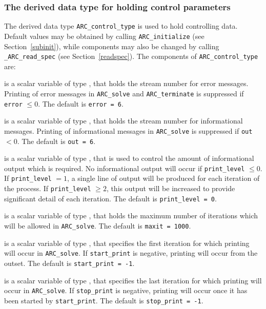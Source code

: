 \documentclass{galahad}
\newcommand{\packagename}{ARC}
\newcommand{\fullpackagename}{\libraryname\_\packagename}
\begin{document}

\subsubsection{The derived data type for holding control
 parameters}\label{typecontrol}
The derived data type
{\tt \packagename\_control\_type}
is used to hold controlling data. Default values may be obtained by calling
{\tt \packagename\_initialize}
(see Section~\ref{subinit}),
while components may also be changed by calling
{\tt \fullpackagename\_read\-\_spec}
(see Section~\ref{readspec}).
The components of
{\tt \packagename\_control\_type}
are:


\begin{description}

 is a scalar variable of type \integer, that holds the
stream number for error messages. Printing of error messages in
{\tt \packagename\_solve} and {\tt \packagename\_terminate}
is suppressed if {\tt error} $\leq 0$.
The default is {\tt error = 6}.

 is a scalar variable of type \integer, that holds the
stream number for informational messages. Printing of informational messages in
{\tt \packagename\_solve} is suppressed if {\tt out} $< 0$.
The default is {\tt out = 6}.

 is a scalar variable of type \integer, that is used
to control the amount of informational output which is required. No
informational output will occur if {\tt print\_level} $\leq 0$. If
{\tt print\_level} $= 1$, a single line of output will be produced for each
iteration of the process. If {\tt print\_level} $\geq 2$, this output will be
increased to provide significant detail of each iteration.
The default is {\tt print\_level = 0}.

 is a scalar variable of type \integer, that holds the
maximum number of iterations which will be allowed in {\tt \packagename\_solve}.
The default is {\tt maxit = 1000}.

 is a scalar variable of type \integer, that specifies
the first iteration for which printing will occur in {\tt \packagename\_solve}.
If {\tt start\_print} is negative, printing will occur from the outset.
The default is {\tt start\_print = -1}.

 is a scalar variable of type \integer, that specifies
the last iteration for which printing will occur in  {\tt \packagename\_solve}.
If {\tt stop\_print} is negative, printing will occur once it has been
started by {\tt start\_print}.
The default is {\tt stop\_print = -1}.


\end{description}
\end{document}
